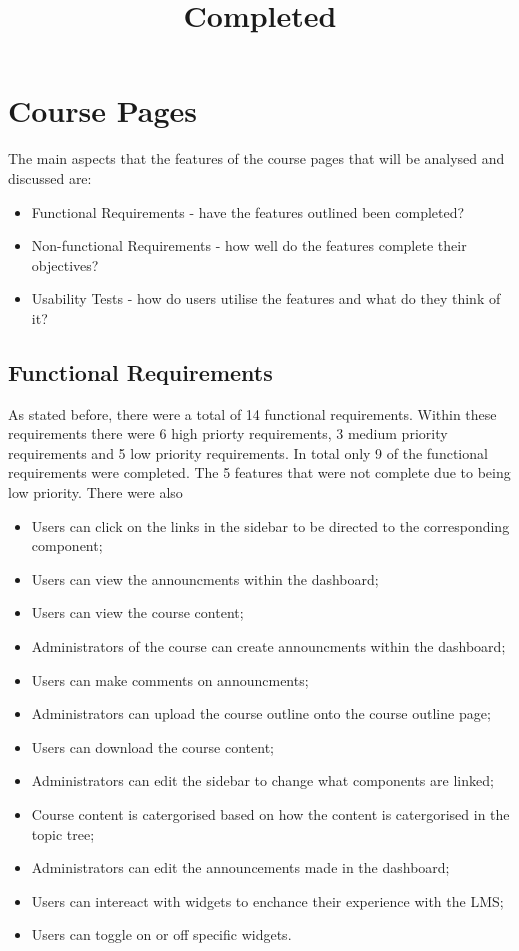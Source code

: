 \section{Course Pages}

The main aspects that the features of the course pages that will be analysed and discussed are:
\begin{itemize}
    \item Functional Requirements - have the features outlined been completed?
    \item Non-functional Requirements - how well do the features complete their objectives?
    \item Usability Tests - how do users utilise the features and what do they think of it?
\end{itemize}

\subsection{Functional Requirements}
As stated before, there were a total of 14 functional requirements. Within these requirements there were 6 high priorty requirements, 3 medium priority requirements and 5 low priority requirements.
In total only 9 of the functional requirements were completed. The 5 features that were not complete due to being low priority. There were also 

\title{Completed}
\begin{itemize}
    \item Users can click on the links in the sidebar to be directed to the corresponding component;
    \item Users can view the announcments within the dashboard;
    \item Users can view the course content;
    \item Administrators of the course can create announcments within the dashboard;
    \item Users can make comments on announcments;
    \item Administrators can upload the course outline onto the course outline page;
    \item Users can download the course content;
    \item Administrators can edit the sidebar to change what components are linked;
    \item Course content is catergorised based on how the content is catergorised in the topic tree;
    \item Administrators can edit the announcements made in the dashboard;
    \item Users can intereact with widgets to enchance their experience with the LMS;
    \item Users can toggle on or off specific widgets.
\end{itemize}

